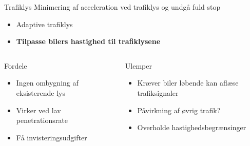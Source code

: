 \begin{frame}{Trafiklys}
Minimering af acceleration ved trafiklys og undgå fuld stop
\begin{itemize}
\item Adaptive trafiklys
\item \textbf{Tilpasse bilers hastighed til trafiklysene}
\end{itemize}


\begin{center}
\begin{columns}%
\begin{column}{0.4\textwidth}
Fordele
\begin{itemize}
\item Ingen ombygning af eksisterende lys
\item Virker ved lav penetrationsrate
\item Få invisteringsudgifter 
\end{itemize}
\end{column}

\begin{column}{0.5\textwidth}
Ulemper
\begin{itemize}
\item Kræver biler løbende kan aflæse trafiksignaler
\item Påvirkning af øvrig trafik?
\item Overholde hastighedsbegrænsinger %
\end{itemize}
\vspace{8mm}
\end{column}
\end{columns}
\end{center}
\end{frame}

